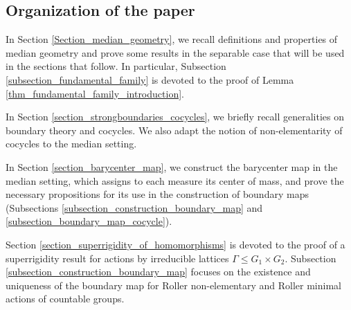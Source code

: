 \documentclass{amsart}
\numberwithin{equation}{section}
\theoremstyle{definition}
\begin{document}


\subsection{Organization of the paper}
In Section \ref{Section_median_geometry}, we recall definitions and properties of median geometry and prove some results in the separable case that will be used in the sections that follow. In particular, Subsection \ref{subsection_fundamental_family} is devoted to the proof of Lemma \ref{thm_fundamental_family_introduction}.

In Section \ref{section_strongboundaries_cocycles}, we briefly recall generalities on boundary theory and cocycles. We also adapt the notion of non-elementarity of cocycles to the median setting.

In Section \ref{section_barycenter_map}, we construct the barycenter map in the median setting, which assigns to each measure its center of mass, and prove the necessary propositions for its use in the construction of boundary maps (Subsections \ref{subsection_construction_boundary_map} and \ref{subsection_boundary_map_cocycle}).

Section \ref{section_superrigidity_of_homomorphisms} is devoted to the proof of a superrigidity result for actions by irreducible lattices $\Gamma \leq G_1 \times G_2$. Subsection \ref{subsection_construction_boundary_map} focuses on the existence and uniqueness of the boundary map for Roller non-elementary and Roller minimal actions of countable groups.
\end{document}
